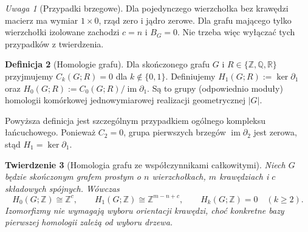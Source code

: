 \documentclass[11pt,a4paper]{report}
\numberwithin{equation}{section}
\theoremstyle{plain}
\newtheorem{twierdzenie}{Twierdzenie}[section]
\theoremstyle{definition}
\newtheorem{definicja}[twierdzenie]{Definicja}
\theoremstyle{remark}
\newtheorem{uwaga}[twierdzenie]{Uwaga}
\begin{document}
\begin{uwaga}[Przypadki brzegowe]
Dla pojedynczego wierzchołka bez krawędzi macierz ma wymiar
$1\times0$, rząd zero i jądro zerowe. Dla grafu mającego tylko
wierzchołki izolowane zachodzi $c=n$ i $B_G=0$.
Nie trzeba więc wyłączać tych przypadków z twierdzenia.
\end{uwaga}

\begin{definicja}[Homologie grafu]
Dla skończonego grafu $G$ i $R\in\{\mathbb Z,\mathbb Q,\mathbb R\}$
przyjmujemy $C_k(G;R)=0$ dla $k\notin\{0,1\}$.
Definiujemy $H_1(G;R):=\ker\partial_1$ oraz
$H_0(G;R):=C_0(G;R)/\operatorname{im}\partial_1$.
Są to grupy (odpowiednio moduły) homologii komórkowej
jednowymiarowej realizacji geometrycznej $|G|$.
\end{definicja}

Powyższa definicja jest szczególnym przypadkiem ogólnego kompleksu
łańcuchowego. Ponieważ $C_2=0$, grupa pierwszych brzegów
$\operatorname{im}\partial_2$ jest zerowa, stąd $H_1=\ker\partial_1$.

\begin{twierdzenie}[Homologia grafu ze współczynnikami całkowitymi]
\label{thm:tg-homology}
Niech $G$ będzie skończonym grafem prostym o $n$ wierzchołkach,
$m$ krawędziach i $c$ składowych spójnych. Wówczas
\[
H_0(G;\mathbb Z)\cong\mathbb Z^c,\qquad
H_1(G;\mathbb Z)\cong\mathbb Z^{m-n+c},\qquad
H_k(G;\mathbb Z)=0\quad(k\ge2).
\]
Izomorfizmy nie wymagają wyboru orientacji krawędzi, choć
konkretne bazy pierwszej homologii zależą od wyboru drzewa.
\end{twierdzenie}
\end{document}
